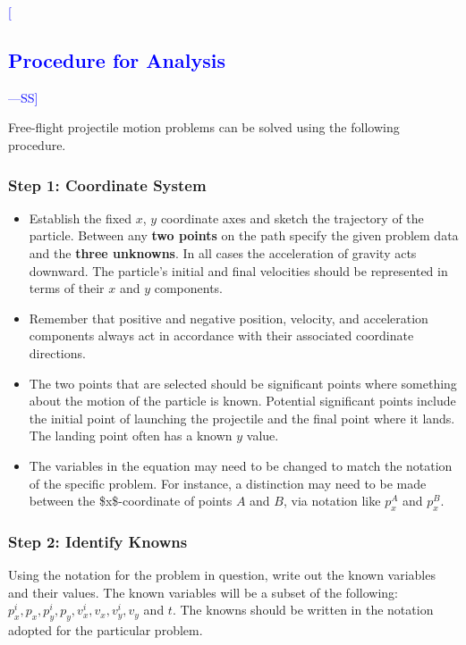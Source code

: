 \documentclass[12pt]{article}
\newcommand{\authornote}[3]{\textcolor{#1}{[#3 ---#2]}}
\newcommand{\authornote}[3]{}
\newcommand{\wss}[1]{\authornote{blue}{SS}{#1}}
\begin{document}
\wss{\subsection{Procedure for Analysis}} %

Free-flight projectile motion problems can be solved using the
following procedure.

\subsubsection{Step 1: Coordinate System} \label{sec:org31dfaea}

\begin{itemize}
\item Establish the fixed \(x\), \(y\) coordinate axes and sketch the
trajectory of the particle.  Between any \textbf{two points} on the path
specify the given problem data and the \textbf{three unknowns}.  In all
cases the acceleration of gravity acts downward.  The particle's
initial and final velocities should be represented in terms of their
\(x\) and \(y\) components.

\item Remember that positive and negative position, velocity, and
acceleration components always act in accordance with their
associated coordinate directions.

\item The two points that are selected should be significant points where
something about the motion of the particle is known.  Potential
significant points include the initial point of launching the
projectile and the final point where it lands. The landing point
often has a known \(y\) value.

\item The variables in the equation may need to be changed to match the
notation of the specific problem.  For instance, a distinction may
need to be made between the \$x\$-coordinate of points \(A\) and \(B\),
via notation like \(p_x^A\) and \(p_x^B\).
\end{itemize}

\subsubsection{Step 2: Identify Knowns}
\label{sec:org8a3b415}

Using the notation for the problem in question, write out the known
variables and their values. The known variables will be a subset of
the following: \(p^i_x, p_x, p^i_y, p_y, v^i_x, v_x, v^i_y, v_y\) and
\(t\). The knowns should be written in the notation adopted for the
particular problem.
\end{document}
